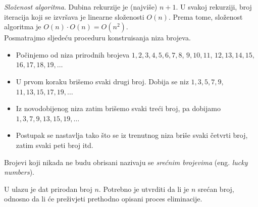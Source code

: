 \emph{Složenost algoritma}. Dubina rekurzije je (najviše) $n+1$. U svakoj rekurziji, broj iteracija koji se izvršava je linearne složenosti $O(n)$. Prema tome, složenost algoritma je $O(n) \cdot O(n) = O(n^2)$.  \\


 
 Posmatrajmo sljedeću proceduru konstruisanja niza brojeva.
 
 \begin{itemize}
 	\item Počinjemo od niza prirodnih brojeva
 	$1, 2, 3, 4, 5, 6, 7, 8$, $9, 10, 11$, $12, 13, 14, 15,$ $16, 17, 18, 19,\ldots 	$
 	
 	\item U prvom koraku brišemo svaki drugi broj. Dobija se niz $1, 3, 5, 7, 9,$ $11, 13, 15, 17, 19,\ldots$
 	
 	\item Iz novodobijenog niza zatim brišemo svaki treći broj, pa dobijamo $
 	1, 3, 7, 9, 13, 15, 19,\ldots
 	$
 	
 	\item Postupak se nastavlja tako što se iz trenutnog niza briše svaki četvrti broj, zatim svaki peti broj itd.
 	
 \end{itemize}
 
 Brojevi koji nikada ne budu obrisani nazivaju se \textit{srećnim brojevima} (eng. \textit{lucky numbers}).
 
 \medskip
 
 U ulazu je dat prirodan broj $n$. Potrebno je utvrditi da li je $n$ srećan broj, odnosno da li će preživjeti prethodno opisani proces eliminacije.
 
